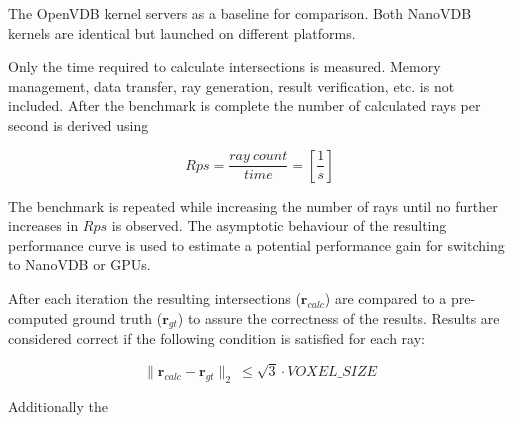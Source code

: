 The OpenVDB kernel servers as a baseline for comparison.
Both NanoVDB kernels are identical but launched on different platforms.

Only the time required to calculate intersections is measured. Memory management, data transfer, ray generation, result verification, etc. is not included.
After the benchmark is complete the number of calculated rays per second is derived using

\begin{equation}
	Rps = \frac{ray \: count}{time} = [\frac{1}{s}]
\end{equation}

The benchmark is repeated while increasing the number of rays until no further increases in $Rps$ is observed.
The asymptotic behaviour of the resulting performance curve is used to estimate a potential performance gain for switching to NanoVDB or GPUs.

After each iteration the resulting intersections ($\mathbf{r}_{calc}$) are compared to a pre-computed ground truth ($\mathbf{r}_{gt}$) to assure the correctness of the results. 
Results are considered correct if the following condition is satisfied for each ray:

\begin{equation}
	\lVert \mathbf{r}_{calc} - \mathbf{r}_{gt} \lVert _2 \:  \leq \sqrt{3} \cdot VOXEL\_SIZE
\end{equation}

Additionally the 


